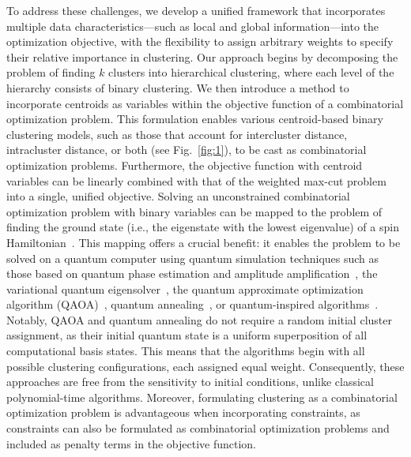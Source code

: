 \documentclass[showpacs,twocolumn,superscriptaddress]{revtex4-2}
\begin{document}
To address these challenges, we develop a unified framework that incorporates multiple data characteristics---such as local and global information---into the optimization objective, with the flexibility to assign arbitrary weights to specify their relative importance in clustering. Our approach begins by decomposing the problem of finding $k$ clusters into hierarchical clustering, where each level of the hierarchy consists of binary clustering. We then introduce a method to incorporate centroids as variables within the objective function of a combinatorial optimization problem. This formulation enables various centroid-based binary clustering models, such as those that account for intercluster distance, intracluster distance, or both (see Fig.~\ref{fig:1}), to be cast as combinatorial optimization problems. Furthermore, the objective function with centroid variables can be linearly combined with that of the weighted max-cut problem into a single, unified objective. Solving an unconstrained combinatorial optimization problem with binary variables can be mapped to the problem of finding the ground state (i.e., the eigenstate with the lowest eigenvalue) of a spin Hamiltonian~\cite{10.3389/fphy.2014.00005}. This mapping offers a crucial benefit: it enables the problem to be solved on a quantum computer using quantum simulation techniques such as those based on quantum phase estimation and amplitude amplification~\cite{dong2022ground, poulin2009preparing, ge2019faster, lin2020near, zeng2023universal}, the variational quantum eigensolver~\cite{peruzzo_variational_2014,McClean_2016,cerezo2020variational}, the quantum approximate optimization algorithm (QAOA)~\cite{farhi2014quantum}, quantum annealing~\cite{johnson2011quantum}, or quantum-inspired algorithms~\cite{jiang2023efficient}.
Notably, QAOA and quantum annealing do not require a random initial cluster assignment, as their initial quantum state is a uniform superposition of all computational basis states. This means that the algorithms begin with all possible clustering configurations, each assigned equal weight. Consequently, these approaches are free from the sensitivity to initial conditions, unlike classical polynomial-time algorithms. Moreover, formulating clustering as a combinatorial optimization problem is advantageous when incorporating constraints, as constraints can also be formulated as combinatorial optimization problems and included as penalty terms in the objective function.
\end{document}
